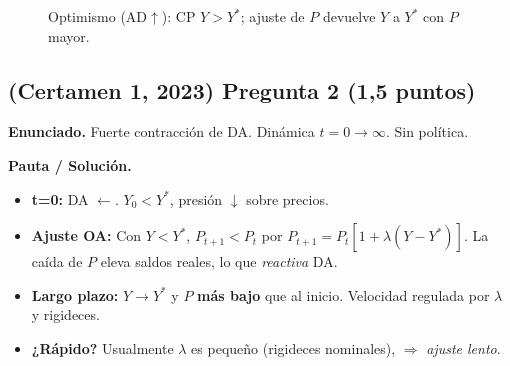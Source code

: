 \documentclass[11pt,addpoints]{article}
\begin{document}
\begin{figure}[h!]
\centering
{}
\caption{Optimismo (AD$\uparrow$): CP $Y>Y^*$; ajuste de $P$ devuelve $Y$ a $Y^*$ con $P$ mayor.}
\end{figure}



\subsection*{(Certamen 1, 2023) \quad Pregunta 2 (1,5 puntos)}
\textbf{Enunciado.} Fuerte contracción de DA. Dinámica \(t=0 \to \infty\). Sin política.

\textbf{Pauta / Solución.}
\begin{itemize}
\item \textbf{t=0:} DA \(\leftarrow\). \(Y_0<Y^*\), presión \(\downarrow\) sobre precios.

\newpage
\vspace*{0.1cm}
\item \textbf{Ajuste OA:} Con \(Y<Y^*\), \(P_{t+1}<P_t\) por \(P_{t+1}=P_t[1+\lambda(Y-Y^*)]\). La caída de \(P\) eleva saldos reales, lo que \emph{reactiva} DA.
\item \textbf{Largo plazo:} \(\boxed{Y \to Y^*}\) y \(\boxed{P}\) \textbf{más bajo} que al inicio. Velocidad regulada por \(\lambda\) y rigideces.

\item \textbf{¿Rápido?} Usualmente \(\lambda\) es pequeño (rigideces nominales), \(\Rightarrow\) \emph{ajuste lento}.
\end{itemize}
\end{document}
